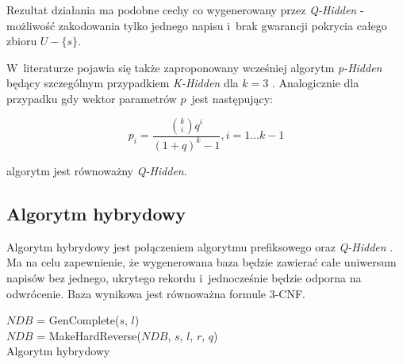 Rezultat działania ma podobne cechy co wygenerowany przez \textit{Q-Hidden} - możliwość zakodowania tylko
jednego napisu i~brak gwarancji pokrycia całego zbioru $U - \{s\}$.

W~literaturze pojawia się także zaproponowany wcześniej algorytm \textit{p-Hidden} będący szczególnym przypadkiem \textit{K-Hidden} dla $k=3$ \cite{p-hidden}.
Analogicznie dla przypadku gdy wektor parametrów $p$~jest następujący:

\[ p_i = \frac{{{k}\choose{i}}q^i}{(1+ q)^k - 1}, i = 1 \dots k-1   \]

algorytm jest równoważny \textit{Q-Hidden}. \cite{k-hidden}

\subsection{Algorytm hybrydowy}
Algorytm hybrydowy jest połączeniem algorytmu prefiksowego oraz \textit{Q-Hidden} \cite{hybrid}. 
Ma na celu zapewnienie, że wygenerowana baza będzie zawierać całe uniwersum napisów bez jednego, ukrytego rekordu i~jednocześnie
będzie odporna na odwrócenie.  Baza wynikowa jest równoważna formule 3-CNF.

\begin{algorithm}[!htb]
    \SetAlgoLined
   
    $NDB$ = GenComplete($s$, $l$)\\
    $NDB$ = MakeHardReverse($NDB$, $s$, $l$, $r$, $q$)\\
    \caption{Algorytm hybrydowy}
    \label{alg:hybrid}
\end{algorithm}

